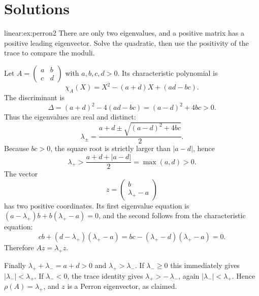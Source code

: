 \section{Solutions}

\begin{solution}{linear:ex:perron2}
\idea There are only two eigenvalues, and a positive matrix has a positive leading eigenvector. Solve the quadratic, then use the positivity of the trace to compare the moduli.

\writeup Let $A=\begin{pmatrix}a&b\\c&d\end{pmatrix}$ with $a,b,c,d>0$. Its characteristic polynomial is
\[
\chi_A(X)=X^2-(a+d)X+(ad-bc).
\]
The discriminant is
\[
\Delta=(a+d)^2-4(ad-bc)=(a-d)^2+4bc>0.
\]
Thus the eigenvalues are real and distinct:
\[
\lambda_\pm=\frac{a+d\pm\sqrt{(a-d)^2+4bc}}2.
\]
Because $bc>0$, the square root is strictly larger than $|a-d|$, hence
\[
\lambda_+>\frac{a+d+|a-d|}2=\max(a,d)>0.
\]
The vector
\[
z=\begin{pmatrix}b\\\lambda_+-a\end{pmatrix}
\]
has two positive coordinates. Its first eigenvalue equation is $(a-\lambda_+)b+b(\lambda_+-a)=0$, and the second follows from the characteristic equation:
\[
cb+(d-\lambda_+)(\lambda_+-a)
=bc-(\lambda_+-d)(\lambda_+-a)=0.
\]
Therefore $Az=\lambda_+z$.

Finally $\lambda_++\lambda_-=a+d>0$ and $\lambda_+>\lambda_-$. If $\lambda_-\ge0$ this immediately gives $|\lambda_-|<\lambda_+$. If $\lambda_-<0$, the trace identity gives $\lambda_+>-\,\lambda_-$, again $|\lambda_-|<\lambda_+$. Hence $\rho(A)=\lambda_+$, and $z$ is a Perron eigenvector, as claimed.
\end{solution}

